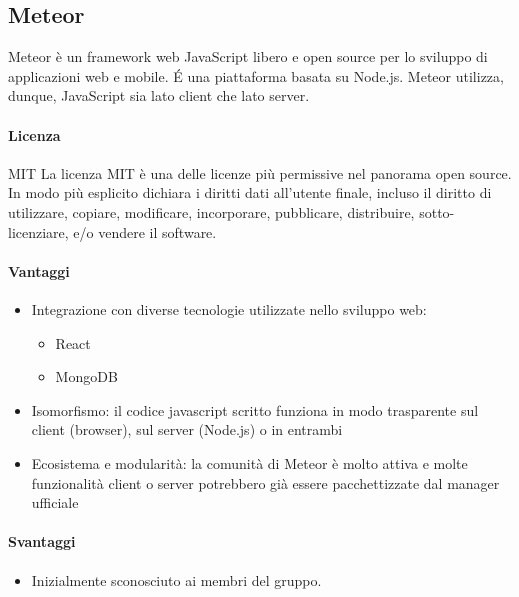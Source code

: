 \subsection{Meteor}

Meteor è un framework web JavaScript libero e open source  per lo
sviluppo di applicazioni web e mobile. \'E una piattaforma basata su
Node.js. Meteor utilizza, dunque, JavaScript sia lato client che lato
server.  
\\
\paragraph{Licenza} MIT 
La licenza MIT è una delle licenze più permissive nel panorama open
source. In modo più esplicito dichiara i diritti dati all'utente
finale, incluso il diritto di utilizzare, copiare, modificare,
incorporare, pubblicare, distribuire, sotto-licenziare, e/o vendere il
software. 


\paragraph{Vantaggi}
\begin{itemize}
	\item Integrazione con diverse tecnologie utilizzate nello sviluppo web:
	\begin{itemize}
		\item React
		\item MongoDB
	\end{itemize}
	\item Isomorfismo: il codice javascript scritto funziona in modo trasparente sul client (browser), sul server (Node.js) o in entrambi
	\item Ecosistema e modularità: la comunità di Meteor è molto attiva
     e molte funzionalità client o server potrebbero già essere
     pacchettizzate dal  manager ufficiale 
\end{itemize}

\paragraph{Svantaggi} %
\begin{itemize}
	\item Inizialmente sconosciuto ai membri del gruppo.
\end{itemize}

